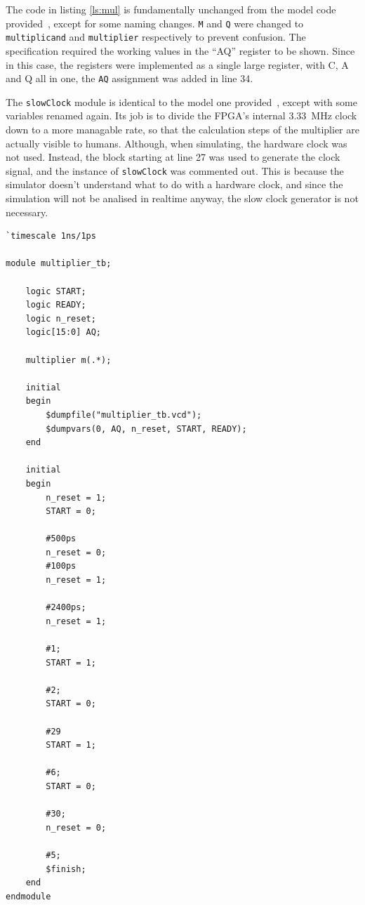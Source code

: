 \documentclass[a4paper,11pt]{article}
\begin{document}
The code in listing \ref{ls:mul} is fundamentally unchanged from the model code provided~\cite{multipliercode}, except for some naming changes. \lstinline{M} and \lstinline{Q} were changed to \lstinline{multiplicand} and \lstinline{multiplier} respectively to prevent confusion. The specification required the working values in the ``AQ'' register to be shown. Since in this case, the registers were implemented as a single large register, with C, A and Q all in one, the \lstinline{AQ} assignment was added in line 34.

The \lstinline{slowClock} module is identical to the model one provided~\cite{slockcode}, except with some variables renamed again. Its job is to divide the FPGA's internal \SI{3.33}{\mega\hertz} clock down to a more managable rate, so that the calculation steps of the multiplier are actually visible to humans. Although, when simulating, the hardware clock was not used. Instead, the block starting at line 27 was used to generate the clock signal, and the instance of \lstinline{slowClock} was commented out. This is because the simulator doesn't understand what to do with a hardware clock, and since the simulation will not be analised in realtime anyway, the slow clock generator is not necessary.

\begin{lstlisting}
`timescale 1ns/1ps

module multiplier_tb;
    
    logic START;
    logic READY;
    logic n_reset;
    logic[15:0] AQ;
    
    multiplier m(.*);
    
    initial
    begin
        $dumpfile("multiplier_tb.vcd");
        $dumpvars(0, AQ, n_reset, START, READY);
    end
    
    initial
    begin
        n_reset = 1;
        START = 0;
        
        #500ps
        n_reset = 0;
        #100ps
        n_reset = 1;
        
        #2400ps;
        n_reset = 1;
        
        #1;
        START = 1;

        #2;
        START = 0;
        
        #29
        START = 1;

        #6;
        START = 0;
        
        #30;
        n_reset = 0;
        
        #5;
        $finish;
    end
endmodule
\end{lstlisting}
\end{document}
